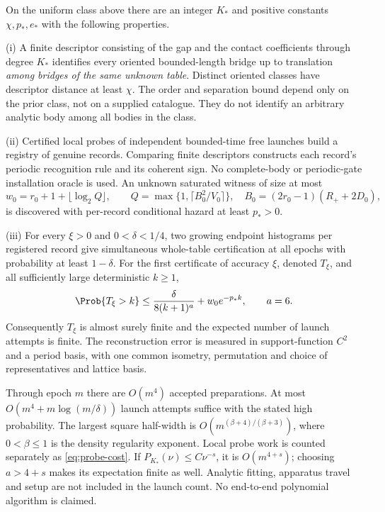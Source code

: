 \begin{theorem}
\label{thm:main}
On the uniform class above there are an integer $K_*$ and positive
constants $\chi,p_*,e_*$ with the following properties.

\textup{(i)} A finite descriptor consisting of the gap and the contact
coefficients through degree $K_*$ identifies every oriented bounded-length
bridge up to translation \emph{among bridges of the same unknown table}.
Distinct oriented classes have descriptor distance at least $\chi$.
The order and separation bound depend only on the prior class, not on a
supplied catalogue. They do not identify an arbitrary analytic body among
all bodies in the class.

\textup{(ii)} Certified local probes of independent bounded-time free
launches build a registry of genuine records. Comparing finite descriptors
constructs each record's periodic recognition rule and its coherent sign.
No complete-body or periodic-gate installation oracle is used. An unknown
saturated witness of size at most
\begin{equation}\label{eq:witness-main}
 w_0=r_0+1+\lfloor\log_2 Q\rfloor,\qquad
 Q=\max\{1,\lceil B_0^2/V_0\rceil\},\quad
 B_0=(2r_0-1)(R_++2D_0),
\end{equation}
is discovered with per-record conditional hazard at least $p_*>0$.

\textup{(iii)} For every $\xi>0$ and $0<\delta<1/4$, two growing
endpoint histograms per registered record give simultaneous whole-table
certification at all epochs with probability at least $1-\delta$.
For the first certificate of accuracy $\xi$, denoted $T_\xi$, and all
sufficiently large deterministic $k\ge1$,
\begin{equation}\label{eq:main-tail}
 \Prob\{T_\xi>k\}\le\frac{\delta}{8(k+1)^a}+w_0e^{-p_*k},
 \qquad a=6.
\end{equation}
Consequently $T_\xi$ is almost surely finite and the expected number
of launch attempts is finite. The reconstruction error is measured in
support-function $C^2$ and a period basis, with one common isometry,
permutation and choice of representatives and lattice basis.

Through epoch $m$ there are $O(m^4)$ accepted preparations. At most
$O(m^4+m\log(m/\delta))$ launch attempts suffice with the stated
high probability. The largest square half-width is
$O(m^{(\beta+4)/(\beta+3)})$, where $0<\beta\le1$ is the density
regularity exponent. Local probe work is counted separately as
\eqref{eq:probe-cost}. If $P_{K_*}(\nu)\le C\nu^{-s}$, it is
$O(m^{4+s})$; choosing $a>4+s$ makes its expectation finite as well.
Analytic fitting, apparatus travel and setup are not included in the
launch count. No end-to-end polynomial algorithm is claimed.
\end{theorem}


